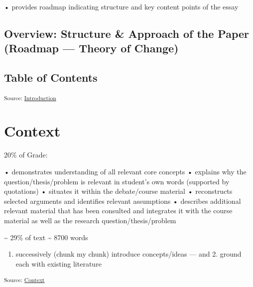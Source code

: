 \documentclass[12pt,a4paper]{book}      %
\providecommand{\tightlist}{%
  \setlength{\itemsep}{0pt}\setlength{\parskip}{0pt}}
\begin{document}
• provides roadmap indicating structure and key content points of the
essay

\section{Overview: Structure \& Approach of the Paper (Roadmap ---
Theory of
Change)}\label{overview-structure-approach-of-the-paper-roadmap-theory-of-change}

\section{Table of Contents}\label{table-of-contents}

\textsubscript{Source:
\href{https://VJMeyer.github.io/submission/chapters/Introduction.qmd.html\#23a3e2da-2445-4edd-96f4-8767e2857de6}{Introduction}}

\chapter{}\label{section-2}

\chapter{Context}\label{context}

20\% of Grade:

• demonstrates understanding of all relevant core concepts • explains
why the question/thesis/problem is relevant in student's own words
(supported by quotations) • situates it within the debate/course
material • reconstructs selected arguments and identifies relevant
assumptions • describes additional relevant material that has been
consulted and integrates it with the course material as well as the
research question/thesis/problem

\textasciitilde{} 29\% of text \textasciitilde{} 8700 words

\begin{enumerate}
\def\labelenumi{\arabic{enumi}.}
\tightlist
\item
  successively (chunk my chunk) introduce concepts/ideas --- and 2.
  ground each with existing literature
\end{enumerate}

\textsubscript{Source:
\href{https://VJMeyer.github.io/submission/chapters/Context.qmd.html\#41e533eb-06e4-4c34-b013-344a963258c1}{Context}}

\chapter{}\label{section-3}
\end{document}
